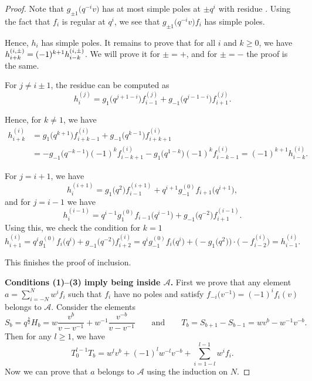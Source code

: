 \documentclass[pdftex]{sigma}
\newcommand{\mc}{\mathcal}
\numberwithin{equation}{section}
\theoremstyle{definition}
\begin{document}
\begin{proof}
Note that $g_{\pm 1}\bigl(q^{-i}v\bigr)$ has at most simple poles at $\pm q^{i}$ with residue . Using the fact that $f_i$ is regular at $q^i$, we see that $g_{\pm 1}\bigl(q^{-i}v\bigr)f_i$ has simple poles.

Hence, $h_i$ has simple poles. It remains to prove that for all $i$ and $k\geq 0$, we have $\smash{h_{i+k}^{(i,\pm)}}=\smash{(-1)^{k+1}h_{i-k}^{(i,\pm)}}$. We will prove it for $\pm=+$, and for $\pm=-$ the proof is the same.

For $j\neq i\pm 1$, the residue  can be computed as \begin{equation}
 \label{EqHij}
 h_i^{(j)}=g_1\bigl(q^{j+1-i}\bigr)f_{i-1}^{(j)}+g_{-1}\bigl(q^{j-1-i}\bigr)f_{i+1}^{(j)}.
\end{equation}

Hence, for $k\neq 1$, we have
\begin{align*}
 h_{i+k}^{(i)}&=g_1\bigl(q^{k+1}\bigr)f_{i+k-1}^{(i)}+g_{-1}\bigl(q^{k-1}\bigr)f_{i+k+1}^{(i)}\\
 &=-g_{-1}\bigl(q^{-k-1}\bigr)(-1)^k f_{i-k+1}^{(i)}-g_1\bigl(q^{1-k}\bigr)(-1)^kf_{i-k-1}^{(i)}=(-1)^{k+1}h_{i-k}^{(i)}.
\end{align*}


For $j=i+1$, we have \[h_i^{(i+1)}=g_1\bigl(q^2\bigr)f_{i-1}^{(i+1)}+q^{i+1}g_{-1}^{(0)}f_{i+1}\bigl(q^{i+1}\bigr),\]
and for $j=i-1$ we have
\begin{equation}
\label{EqHii1}
 h_i^{(i-1)}=q^{i-1}g_1^{(0)}f_{i-1}\bigl(q^{i-1}\bigr)+g_{-1}\bigl(q^{-2}\bigr)f_{i+1}^{(i-1)}.
\end{equation}
Using this, we check the condition for $k=1$
\[h_{i+1}^{(i)}=q^ig_1^{(0)}f_i\bigl(q^i\bigr)+g_{-1}\bigl(q^{-2}\bigr)f_{i+2}^{(i)}= q^ig_{-1}^{(0)}f_i\bigl(q^i\bigr)+\bigl(-g_1\bigl(q^2\bigr)\bigr)\cdot \bigl(-f_{i-2}^{(i)}\bigr)=h_{i-1}^{(i)}.\]

This finishes the proof of inclusion.

{\bf Conditions (1)--(3) imply being inside $\mc{A}$.}
First we prove that any element $a=\sum_{i=-N}^N w^i f_i$ such that $f_i$ have no poles and satisfy $f_{-i}\bigl(v^{-1}\bigr)=(-1)^i f_i(v)$ belongs to $\mc{A}$. Consider the elements{\samepage
\[
S_b=q^{\tfrac b2}H_b=w\frac{v^b}{v-v^{-1}}+w^{-1}\frac{v^{-b}}{v-v^{-1}} \qquad \text{and}\qquad T_b=S_{b+1}-S_{b-1}=wv^b-w^{-1}v^{-b}.
\] Then for any $l\geq 1$, we have \[T_0^{l-1}T_b=w^lv^b+(-1)^l w^{-l}v^{-b}+\sum_{i=1-l}^{l-1}w^if_i.\] Now we can prove that $a$ belongs to $\mc{A}$ using the induction on $N$.}


\end{proof}
\end{document}
